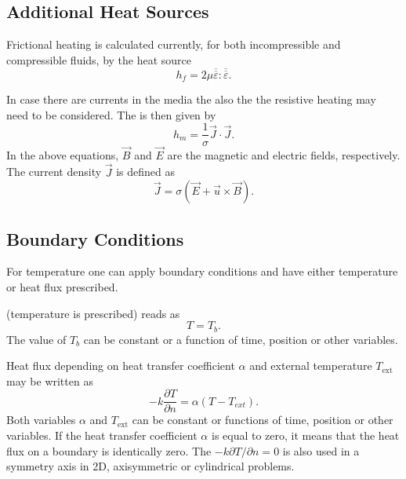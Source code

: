 \subsection{Additional Heat Sources}

Frictional heating is calculated currently, for both incompressible and 
compressible fluids, by the heat source
\begin{equation}
h_f = 2\mu\overline{\overline\varepsilon}:\overline{\overline\varepsilon}.
\end{equation}

In case there are currents in the media the also the 
the resistive heating may need to be considered.
The  is then given by
\begin{equation}
h_m = \frac{1}{\sigma} \vec J \cdot \vec J.
\end{equation}
In the above equations, $\vec B$ and $\vec E$ are the magnetic and electric
fields, respectively. The current density $\vec J$ is defined as
\begin{equation}
\vec J = \sigma(\vec E + \vec u\times \vec B).
\end{equation}


\subsection{Boundary Conditions}
For temperature one can apply boundary conditions and have either temperature 
or heat flux prescribed.

 (temperature is 
prescribed) reads as
\begin{equation}
T=T_b.
\end{equation}
\noindent The value  of $T_b$ can be constant or a function of time, position or 
other variables. 

Heat flux depending on heat transfer coefficient $\alpha$ and external
temperature $T_{\mathrm{ext}}$ may be written as
\begin{equation}
-k\frac{\partial T}{\partial n} =\alpha (T-T_{ext} ).
\end{equation}
Both variables $\alpha$ and $T_\mathrm{ext}$ can be constant or functions of time, 
position or other variables. If the heat transfer coefficient $\alpha$ is equal
to zero, it means that the heat flux on a boundary is identically zero. The 
 $-k\partial T/\partial n =0$ is also used in a 
symmetry axis in 2D, axisymmetric or cylindrical problems.

